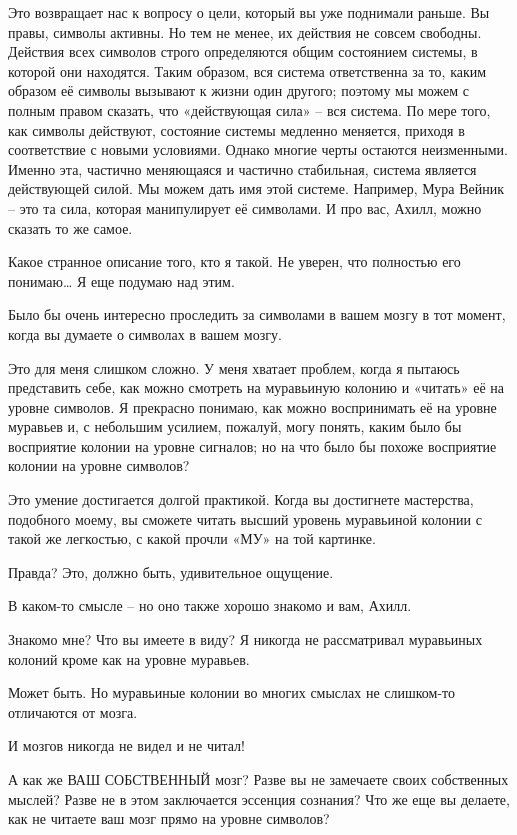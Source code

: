 \documentclass[../main.tex]{subfiles}
\begin{document}
\begin{dialogue}
 Это возвращает нас к вопросу о цели, который вы уже поднимали раньше. Вы правы, символы активны. Но тем не менее, их действия не совсем свободны. Действия всех символов строго определяются общим состоянием системы, в которой они находятся. Таким образом, вся система ответственна за то, каким образом её символы вызывают к жизни один другого; поэтому мы можем с полным правом сказать, что «действующая сила» \--- вся система. По мере того, как символы действуют, состояние системы медленно меняется, приходя в соответствие с новыми условиями. Однако многие черты остаются неизменными. Именно эта, частично меняющаяся и частично стабильная, система является действующей силой. Мы можем дать имя этой системе. Например, Мура Вейник \--- это та сила, которая манипулирует её символами. И про вас, Ахилл, можно сказать то же самое.

 Какое странное описание того, кто я такой. Не уверен, что полностью его понимаю\ldots{} Я еще подумаю над этим.

 Было бы очень интересно проследить за символами в вашем мозгу в тот момент, когда вы думаете о символах в вашем мозгу.

 Это для меня слишком сложно. У меня хватает проблем, когда я пытаюсь представить себе, как можно смотреть на муравьиную колонию и «читать» её на уровне символов. Я прекрасно понимаю, как можно воспринимать её на уровне муравьев и, с небольшим усилием, пожалуй, могу понять, каким было бы восприятие колонии на уровне сигналов; но на что было бы похоже восприятие колонии на уровне символов?

 Это умение достигается долгой практикой. Когда вы достигнете мастерства, подобного моему, вы сможете читать высший уровень муравьиной колонии с такой же легкостью, с какой прочли «МУ» на той картинке.

 Правда? Это, должно быть, удивительное ощущение.

 В каком-то смысле \--- но оно также хорошо знакомо и вам, Ахилл.

 Знакомо мне? Что вы имеете в виду? Я никогда не рассматривал муравьиных колоний кроме как на уровне муравьев.

 Может быть. Но муравьиные колонии во многих смыслах не слишком-то отличаются от мозга.

 И мозгов никогда не видел и не читал!

 А как же ВАШ СОБСТВЕННЫЙ мозг? Разве вы не замечаете своих собственных мыслей? Разве не в этом заключается эссенция сознания? Что же еще вы делаете, как не читаете ваш мозг прямо на уровне символов?


\end{dialogue}
\end{document}
